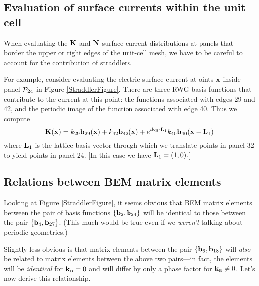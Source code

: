 \subsection{Evaluation of surface currents within the unit cell}

When evaluating the $\mathbf{K}$ and $\mathbf{N}$ surface-current 
distributions at panels that border the upper or right edges 
of the unit-cell mesh, we have to be careful to account for the 
contribution of straddlers. 

For example, consider evaluating the electric surface current at 
oints $\mathbf{x}$ inside panel $\mathcal{P}_{24}$ in Figure \ref{StraddlerFigure}.
There are three RWG basis functions that contribute to the current
at this point: the functions associated with edges 29 and 42,
and the periodic image of the function associated with edge 40.
Thus we compute
$$ \mathbf{K}(\mathbf{x}) 
   =   k_{29} \mathbf{b}_{29}(\mathbf{x}) + k_{42} \mathbf{b}_{42}(\mathbf{x}) 
     + e^{i \mathbf{k}_{\hbox{\tiny{B}}} \cdot \mathbf{L}_1} k_{40} \mathbf{b}_{40}(\mathbf{x}-\mathbf{L}_1)
$$
where $\mathbf{L}_1$ is the lattice basis vector through which we
translate points in panel 32 to yield points in panel 24.
[In this case we have $\mathbf{L}_1=(1,0).$]

\subsection{Relations between BEM matrix elements}

Looking at Figure \ref{StraddlerFigure}, it seems 
obvious that BEM matrix elements between the pair of 
basis functions
$\{\mathbf{b}_2, \mathbf{b}_{24}\}$ will be identical to those
between the pair 
$\{\mathbf{b}_4, \mathbf{b}_{27}\}$. (This much would be 
true even if we \textit{weren't} talking about
periodic geometries.)

Slightly less obvious is that matrix elements between
the pair $\{\mathbf{b}_6, \mathbf{b}_{18}\}$ will \textit{also}
be related to matrix elements between the above two
pairs---in fact, the elements will be \textit{identical}
for $\mathbf{k}_{\hbox{\tiny{B}}}=0$ and will differ by only a phase factor
for $\mathbf{k}_{\hbox{\tiny{B}}}\ne 0$. Let's now derive this relationship.

